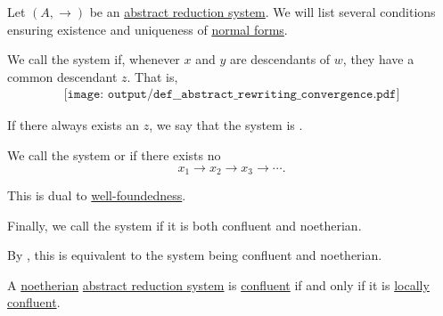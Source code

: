 \begin{definition}\label{def:abstract_rewriting_convergence}
  Let \( (A, \to) \) be an \hyperref[def:abstract_reduction_system]{abstract reduction system}. We will list several conditions ensuring existence and uniqueness of \hyperref[def:abstract_reduction_system/normal_form]{normal forms}.

  \begin{thmenum}
     We call the system  if, whenever \( x \) and \( y \) are descendants of \( w \), they have a common descendant \( z \). That is,
    \begin{equation}\label{eq:def:abstract_rewriting_convergence/confluence/diagram}
      \begin{aligned}
        \texttt{[image: output/def\_\_abstract\_rewriting\_convergence.pdf]}
      \end{aligned}
    \end{equation}

    If there always exists an  \( z \), we say that the system is .

     We call the system  or  if there exists no 
    \begin{equation*}
      x_1 \to x_2 \to x_3 \to \cdots.
    \end{equation*}

    This is dual to \hyperref[def:well_founded_relation]{well-foundedness}.

     Finally, we call the system  if it is both confluent and noetherian.

    By , this is equivalent to the system being  confluent and noetherian.
  \end{thmenum}
\end{definition}

\begin{proposition}\label{thm:noetherian_rewriting_system_local_confluence}
  A \hyperref[def:abstract_rewriting_convergence/noetherian]{noetherian}  \hyperref[def:abstract_reduction_system]{abstract reduction system} is \hyperref[def:abstract_rewriting_convergence/confluence]{confluent} if and only if it is \hyperref[def:abstract_rewriting_convergence/confluence]{locally confluent}.
\end{proposition}

